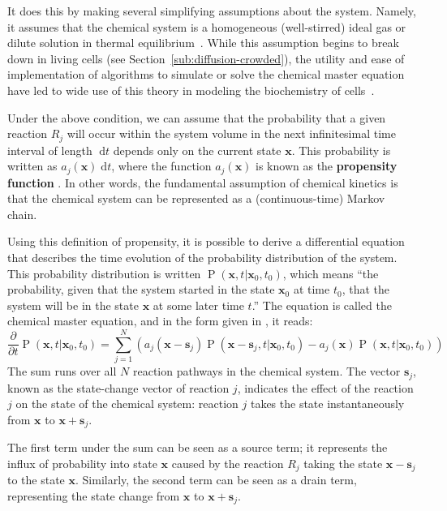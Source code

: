 \documentclass[english,letterpaper,12pt]{report}
\newcommand{\defkeywd}[1]{\textbf{#1}}
\newcommand{\dee}{\;\mathrm{d}}
\renewcommand{\vec}[1]{\ensuremath{\mathbf{#1}}}
\DeclareMathOperator{\Prob}{P}
\begin{document}
\begin{doublespacing}
It does this by making several simplifying assumptions about the system. Namely, it assumes that the chemical system is a homogeneous (well-stirred) ideal gas or dilute solution in thermal equilibrium~\cite{langevin-limit}. While this assumption begins to break down in living cells (see Section~\ref{sub:diffusion-crowded}), the utility and ease of implementation of algorithms to simulate or solve the chemical master equation have led to wide use of this theory in modeling the biochemistry of cells~\cite{we-chemkin}\cite{stoch-sys-bio}.

Under the above condition, we can assume that the probability that a given reaction $R_j$ will occur within the system volume in the next infinitesimal time interval of length $\dee t$ depends only on the current state $\vec{x}$. This probability is written as $a_j(\vec{x}) \dee t$, where the function $a_j(\vec{x})$ is known as the \defkeywd{propensity function} \cite{gillespie-ssa}. In other words, the fundamental assumption of chemical kinetics is that the chemical system can be represented as a (continuous-time) Markov chain.

Using this definition of propensity, it is possible to derive a differential equation that describes the time evolution of the probability distribution of the system. This probability distribution is written $\Prob(\vec{x}, t | \vec{x}_0, t_0)$, which means ``the probability, given that the system started in the state $\vec{x}_0$ at time $t_0$, that the system will be in the state $\vec{x}$ at some later time $t$.'' The equation is called the chemical master equation, and in the form given in \cite{gillespie-ssa}, it reads:
\begin{equation}
    \frac{\partial}{\partial t} \Prob(\vec{x}, t | \vec{x}_0, t_0) = \sum_{j=1}^N \left( a_j (\vec{x} - \vec{s}_j) \Prob(\vec{x} - \vec{s}_j, t | \vec{x}_0, t_0) - a_j(\vec{x}) \Prob(\vec{x}, t | \vec{x}_0, t_0) \right)
    \label{eq:master-eqn-gillespie}
\end{equation}
The sum runs over all $N$ reaction pathways in the chemical system. The vector $\vec{s}_j$, known as the state-change vector of reaction $j$, indicates the effect of the reaction $j$ on the state of the chemical system: reaction $j$ takes the state instantaneously from $\vec{x}$ to $\vec{x} + \vec{s}_j$.

The first term under the sum can be seen as a source term; it represents the influx of probability into state $\vec{x}$ caused by the reaction $R_j$ taking the state $\vec{x} - \vec{s}_j$ to the state $\vec{x}$. Similarly, the second term can be seen as a drain term, representing the state change from $\vec{x}$ to $\vec{x} + \vec{s}_j$.


\end{doublespacing}
\end{document}
